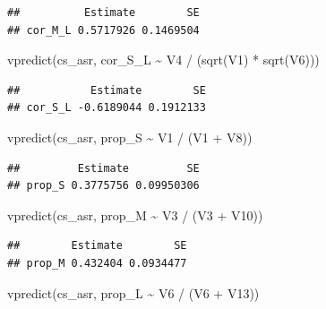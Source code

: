 \documentclass[
  12pt,
]{book}
\newenvironment{Shaded}{\begin{snugshade}}{\end{snugshade}}
\newcommand{\FunctionTok}[1]{\textcolor[rgb]{0.00,0.00,0.00}{#1}}
\newcommand{\NormalTok}[1]{#1}
\newcommand{\SpecialCharTok}[1]{\textcolor[rgb]{0.00,0.00,0.00}{#1}}
\begin{document}
\begin{verbatim}
##          Estimate        SE
## cor_M_L 0.5717926 0.1469504
\end{verbatim}

\begin{Shaded}
\begin{Highlighting}[]
\FunctionTok{vpredict}\NormalTok{(cs\_asr, cor\_S\_L }\SpecialCharTok{\textasciitilde{}}\NormalTok{ V4 }\SpecialCharTok{/}\NormalTok{ (}\FunctionTok{sqrt}\NormalTok{(V1) }\SpecialCharTok{*} \FunctionTok{sqrt}\NormalTok{(V6)))}
\end{Highlighting}
\end{Shaded}

\begin{verbatim}
##           Estimate        SE
## cor_S_L -0.6189044 0.1912133
\end{verbatim}

\begin{Shaded}
\begin{Highlighting}[]
\FunctionTok{vpredict}\NormalTok{(cs\_asr, prop\_S }\SpecialCharTok{\textasciitilde{}}\NormalTok{ V1 }\SpecialCharTok{/}\NormalTok{ (V1 }\SpecialCharTok{+}\NormalTok{ V8))}
\end{Highlighting}
\end{Shaded}

\begin{verbatim}
##         Estimate         SE
## prop_S 0.3775756 0.09950306
\end{verbatim}

\begin{Shaded}
\begin{Highlighting}[]
\FunctionTok{vpredict}\NormalTok{(cs\_asr, prop\_M }\SpecialCharTok{\textasciitilde{}}\NormalTok{ V3 }\SpecialCharTok{/}\NormalTok{ (V3 }\SpecialCharTok{+}\NormalTok{ V10))}
\end{Highlighting}
\end{Shaded}

\begin{verbatim}
##        Estimate        SE
## prop_M 0.432404 0.0934477
\end{verbatim}

\begin{Shaded}
\begin{Highlighting}[]
\FunctionTok{vpredict}\NormalTok{(cs\_asr, prop\_L }\SpecialCharTok{\textasciitilde{}}\NormalTok{ V6 }\SpecialCharTok{/}\NormalTok{ (V6 }\SpecialCharTok{+}\NormalTok{ V13))}
\end{Highlighting}
\end{Shaded}
\end{document}
